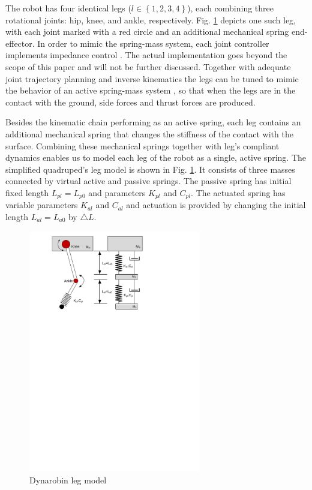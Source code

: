 

The robot has four identical legs ($l\in \left \{ 1,2,3,4 \right \}$), each combining three rotational joints: hip, knee, and ankle, respectively. Fig. \ref{fig:DynarobinLEG} depicts one such leg, with each joint marked with a red circle and an additional mechanical spring end-effector. In order to mimic the spring-mass system, each joint controller implements impedance control \cite{citeulike:2203614}. The actual implementation goes beyond the scope of this paper and will not be further discussed. Together with adequate joint trajectory planning and inverse kinematics the legs can be tuned to mimic the behavior of an active spring-mass system \cite{conf/iros/ParkP12}\cite{6171868}, so that when the legs are in the contact with the ground, side forces and thrust forces are produced.

Besides the kinematic chain performing as an active spring, each leg contains an additional mechanical spring that changes the stiffness of the contact with the surface. Combining these mechanical springs together with leg's compliant dynamics enables us to model each leg of the robot as a single, active spring. The simplified quadruped's leg model is shown in Fig. \ref{fig:DynarobinLEG}. It consists of three masses connected by virtual active and passive springs. The passive spring has initial fixed length $L_{pl}=L_{p0}$ and parameters $K_{pl}$ and $C_{pl}$.  The actuated spring has variable parameters $K_{al}$ and $C_{al}$ and actuation is provided by changing the initial length $L_{al}=L_{a0}$ by $\triangle L$.
\begin{figure}[t!]
	\centering
	\includegraphics[width=75mm]{./pictures/Dynarobin_leg.pdf}
	\caption{Dynarobin leg model}
	\label{fig:DynarobinLEG}
\end{figure}
